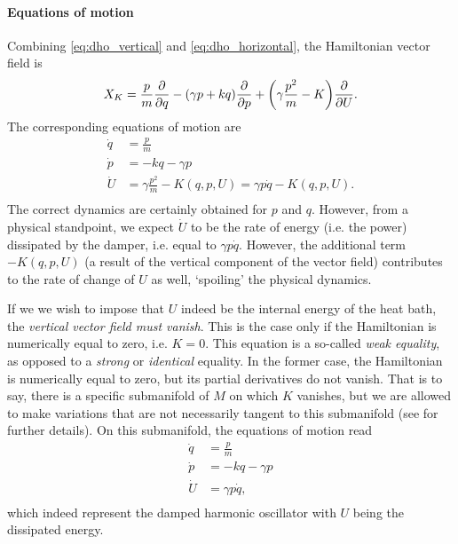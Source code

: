\paragraph{Equations of motion} Combining \cref{eq:dho_vertical} and \cref{eq:dho_horizontal}, the Hamiltonian vector field is
$$ X_K = \frac{p}{m}\pdv{}{q} - (\gamma p + kq)\pdv{}{p} + \qty(\gamma \frac{p^2}{m} - K)\pdv{}{U}.$$
The corresponding equations of motion are 
\begin{equation}
    \begin{split}
        \dot{q} &= \frac{p}{m} \\
        \dot{p} &= -kq -\gamma p \\
        \dot{U} &= \gamma \frac{p^2}{m} - K(q, p, U) = \gamma p\dot{q} - K(q, p, U). \\
    \end{split}
\end{equation}
The correct dynamics are certainly obtained for $p$ and $q$. However, from a physical standpoint, we expect $\dot{U}$ to be the rate of energy (i.e. the power) dissipated by the damper, i.e. equal to $\gamma p \dot{q}$. However, the additional term $-K(q, p, U)$ (a result of the vertical component of the vector field) contributes to the rate of change of $U$ as well, `spoiling' the physical dynamics.

If we we wish to impose that $U$ indeed be the internal energy of the heat bath, the \emph{vertical vector field must vanish}. This is the case only if the Hamiltonian is numerically equal to zero, i.e. $K = 0$. This equation is a so-called \emph{weak equality}, as opposed to a \emph{strong} or \emph{identical} equality. In the former case, the Hamiltonian is numerically equal to zero, but its partial derivatives do not vanish. That is to say, there is a specific submanifold of $M$ on which $K$ vanishes, but we are allowed to make variations that are not necessarily tangent to this submanifold (see \citet{Dirac1950} for further details). On this submanifold, the equations of motion read
\begin{equation}
    \begin{split}
        \dot{q} &= \frac{p}{m} \\
        \dot{p} &= -kq -\gamma p \\
        \dot{U} &= \gamma p\dot{q},\\
    \end{split}
\end{equation}
which indeed represent the damped harmonic oscillator with $U$ being the dissipated energy.

